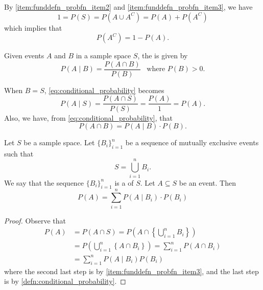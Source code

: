 \documentclass[notoc,notitlepage]{tufte-book}
\begin{document}
\begin{note}
  By \cref{item:funddefn_probfn_item2} and \cref{item:funddefn_probfn_item3}, we
  have
  \begin{equation*}
    1 = P(S) = P(A \cup A^C) = P(A) + P(A^C)
  \end{equation*}
  which implies that
  \begin{equation*}
    P(A^C) = 1 - P(A).
  \end{equation*}
\end{note}

\begin{defn}\label{defn:conditional_probability}
  Given events $A$ and $B$ in a sample space $S$, the  is given by
  \begin{equation}\label{eq:conditional_probability}
    P(A \mid B) = \frac{P(A \cap B)}{P(B)} \enspace \text{ where } P(B) > 0.
  \end{equation}
\end{defn}

\begin{note}
  When $B = S$, \cref{eq:conditional_probability} becomes
  \begin{equation*}
    P(A \mid S) = \frac{P(A \cap S)}{P(S)} = \frac{P(A)}{1} = P(A).
  \end{equation*}
  Also, we have, from \cref{eq:conditional_probability}, that
  \begin{equation*}
    P(A \cap B) = P(A \mid B) \cdot P(B).
  \end{equation*}
\end{note}

\begin{thm}\label{thm:law_of_total_probability}
  Let $S$ be a sample space. Let $\{ B_i \}_{i = 1}^{n}$ be a sequence of
  mutually exclusive events such that
  \begin{equation*}
    S = \bigcup_{i=1}^{n} B_i.
  \end{equation*}
  We say that the sequence $\{ B_i \}_{i = 1}^{n}$ is a  of $S$. Let $A \subseteq S$ be an event. Then
  \begin{equation*}
    P(A) = \sum_{i=1}^{n} P(A \mid B_i) \cdot P(B_i)
  \end{equation*}
\end{thm}

\begin{proof}
  Observe that
  \begin{align*}
    P(A) &= P(A \cap S) = P\left( A \cap \left\{ \bigcup_{i=1}^{n} B_i  \right\} \right) \\
         &= P\left( \bigcup_{i=1}^{n} \left\{ A \cap B_i \right\} \right) = \sum_{i=1}^{n} P(A \cap B_i) \\
         &= \sum_{i=1}^{n} P(A \mid B_i) P(B_i)
  \end{align*}
  where the second last step is by \cref{item:funddefn_probfn_item3}, and the
  last step is by \cref{defn:conditional_probability}.
\end{proof}
\end{document}
